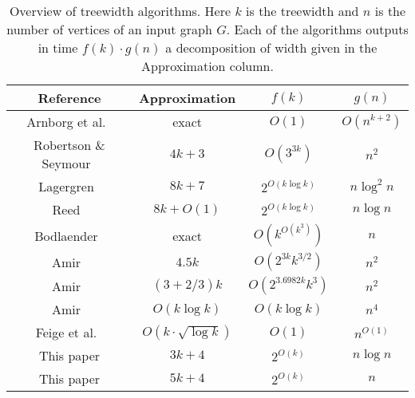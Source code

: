 \documentclass[a4paper,11pt]{article}
\theoremstyle{definition}
\theoremstyle{remark}
\begin{document}
\begin{savenotes}
\begin{table}[htdp]
  \begin{center}
    \begin{tabular}{|c|c|c|c|}
      \hline
      Reference                                 & Approximation   &   $f(k)$&  $g(n)$ \\ \hline
      Arnborg  et al.~\cite{ArnborgCP87}        & exact         & $O(1)$ & $O(n^{k+2})$ \\
      Robertson \& Seymour~\cite{RobertsonS13}  & $4k + 3$      &  $O(3^{3k})$  & $n^2$\\
      Lagergren~\cite{Lagergren96}              & $8k + 7$      & $2^{O(k\log{k})}$ & $n\log^2{n}$\\
      Reed~\cite{Reed92}                        & $8k+O(1)$\footnotemark & $2^{O(k\log{k})}$& $n \log{n}$ \\
      Bodlaender~\cite{Bodlaender96}            & exact      &$O(k^{O(k^3)})$ & $n$\\
      Amir~\cite{Amir10}                        & $4.5k$        & $O(2^{3k}k^{3/2} )$ & $n^2$ \\
      Amir~\cite{Amir10}                        & $(3+2/3)k$    & $O(2^{3.6982k}k^3 )$ & $n^2$ \\
      Amir~\cite{Amir10}                        & $O(k\log{k})$ & $O(k\log{k})$ & $n^4$ \\
      Feige et al.~\cite{FeigeHL08}             & $O(k \cdot \sqrt{\log k})$ & $O(1)$  & $n^{O(1)}$ \\
      This paper                                & $3k + 4$      &  $2^{O(k)}$ & $n\log{n}$ \\
      This paper                                & $5k + 4$      &  $2^{O(k)}$ & $n$ \\
      \hline
    \end{tabular}
  \end{center}
  \caption{Overview of treewidth  algorithms.  Here $k$ is the treewidth
    and $n$ is the number of vertices of an input graph $G$.
    Each of the algorithms outputs in time $f(k)\cdot g(n)$ a
    decomposition of width given in the Approximation column.}
  \label{table:tw_history}
\end{table}
\end{savenotes}

\end{document}

